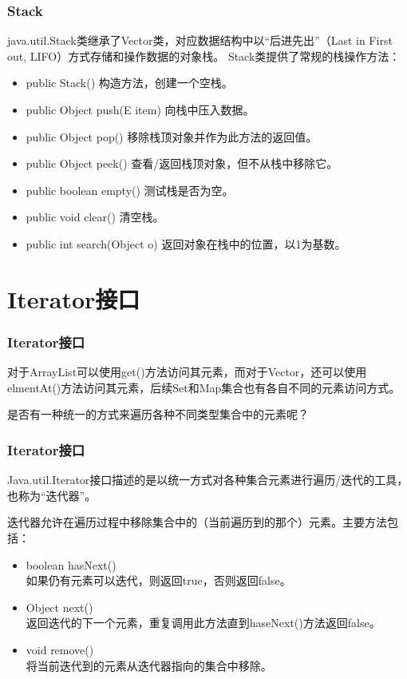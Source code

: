 \documentclass[compress,table]{beamer} %
\newcommand{\hei}{\CJKfamily{SimHei}}
\def\Blue{\color{blue}}
\begin{document}
\begin{frame}[fragile] %
\frametitle{Stack}
java.util.Stack类继承了Vector类，对应数据结构中以“后进先出”（Last in First out, LIFO）方式存储和操作数据的对象栈。
Stack类提供了常规的栈操作方法：
\begin{itemize}
\item public Stack() 构造方法，创建一个空栈。
\item public Object push(E item) 向栈中压入数据。
\item public Object pop() 移除栈顶对象并作为此方法的返回值。
\item public Object peek() 查看/返回栈顶对象，但不从栈中移除它。
\item public boolean empty() 测试栈是否为空。
\item public void clear() 清空栈。
\item public int search(Object o) 返回对象在栈中的位置，以1为基数。
\end{itemize}
\end{frame}

\section{Iterator接口}

\begin{frame}[fragile] %
\frametitle{Iterator接口}

对于ArrayList可以使用get()方法访问其元素，而对于Vector，还可以使用elmentAt()方法访问其元素，后续Set和Map集合也有各自不同的元素访问方式。

{\Blue\hei 是否有一种统一的方式来遍历各种不同类型集合中的元素呢？}\pause

\end{frame}

\begin{frame}[fragile] %
\frametitle{Iterator接口}

Java.util.Iterator接口描述的是以统一方式对各种集合元素进行遍历/迭代的工具，也称为“迭代器”。

迭代器允许在遍历过程中移除集合中的（当前遍历到的那个）元素。主要方法包括：

\begin{itemize}
\item boolean hasNext()\\
如果仍有元素可以迭代，则返回true，否则返回false。
\item Object next()\\
返回迭代的下一个元素，重复调用此方法直到haseNext()方法返回false。
\item void remove()\\
将当前迭代到的元素从迭代器指向的集合中移除。
\end{itemize}
\end{frame}
\end{document}
